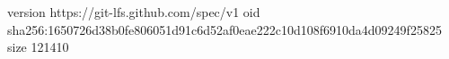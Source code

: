 version https://git-lfs.github.com/spec/v1
oid sha256:1650726d38b0fe806051d91c6d52af0eae222c10d108f6910da4d09249f25825
size 121410
